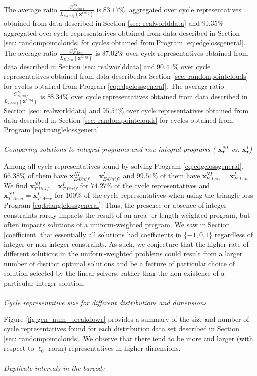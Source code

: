 \documentclass[11pt,onecolumn]{article}
\newcommand{\originalrep}{\mathbf{x}^{Orig}}
\newcommand{\optimalrep}{\mathbf{x}}
\newcommand{\se}{Section }
\newcommand{\fig}{Figure }
\newcommand{\NI}{^{NI}}
\newcommand{\pr}{Program }
\newcommand{\EU}{_{E\text{-}Unif}}
\newcommand{\EL}{_{E\text{-}Len}}
\newcommand{\TU}{_{T\text{-}Unif}}
\newcommand{\TA}{_{T\text{-}Area}}
\theoremstyle{plain}
\theoremstyle{definition}
\begin{document}
The average ratio $\frac{C\NI\EU}{L\EU(\originalrep)}$ is $83.17\%$, aggregated over cycle representatives obtained from data described in \se \ref{sec: realworlddata} and $90.35\%$  aggregated over cycle representatives obtained from data described in \se \ref{sec: randompointclouds} for cycles obtained from \pr \eqref{eq:edgelossgeneral}. The average ratio $\frac{C\NI\EL}{L\EL(\originalrep)}$ is $87.02\%$ over cycle representatives obtained from data described in \se \ref{sec: realworlddata} and $90.41\%$ over cycle representatives obtained from data describedra \se \ref{sec: randompointclouds} for cycles obtained from Program \eqref{eq:edgelossgeneral}. The average ratio $\frac{C\NI\TU}{L\TU(\originalrep)}$ is $88.34\%$ over cycle representatives obtained from data described in \se \ref{sec: realworlddata} and $95.54\%$ over cycle representatives obtained from data described in \se \ref{sec: randompointclouds} for cycles obtained from Program \eqref{eq:trianglelossgeneral}.
\\ \\
\noindent \emph{Comparing solutions to  integral programs and non-integral programs ( $\optimalrep^{NI}_\bullet$ vs. $\optimalrep^{I}_{\bullet}$)}

Among all cycle representatives found by solving \pr \eqref{eq:edgelossgeneral}, $66.38\%$ of them have $\optimalrep^{NI}\EU = \optimalrep^{I}\EU$, and  $99.51\%$ of them have $\optimalrep^{NI}\EL = \optimalrep^{I}\EL$. We find $\optimalrep^{NI}\TU = \optimalrep^{I}\TU$ for $74.27\%$ of the cycle representatives and $\optimalrep^{NI}\TA = \optimalrep^{I}\TA$ for $100\%$ of the cycle representatives when using the triangle-loss \pr \eqref{eq:trianglelossgeneral}. Thus, the presence or absence of integer constraints rarely impacts the result of an area- or length-weighted program, but often impacts solutions of a uniform-weighted program. We saw in \se \ref{coefficient} that essentially all solutions had coefficients in $\{-1, 0, 1\}$ regardless of integer or non-integer constraints. As such, we conjecture that the higher rate of different solutions in the uniform-weighted problems could result from a larger number of distinct optimal solutions and be a feature of particular choice of solution selected by the linear solvers, rather than the non-existence of a particular integer solution.
\\
\\
\noindent \emph{Cycle representative size for different distributions and dimensions}


\fig \ref{fig:gen_num_breakdown} provides a summary of the size and number of cycle representatives found for each distribution data set described in Section \ref{sec: randompointclouds}. We observe that there tend to be more and larger (with respect to $\ell_0$ norm) representatives in higher dimensions.
\\
\\
\noindent \emph{Duplicate intervals in the barcode}
\label{duplicate intervals}
\end{document}
